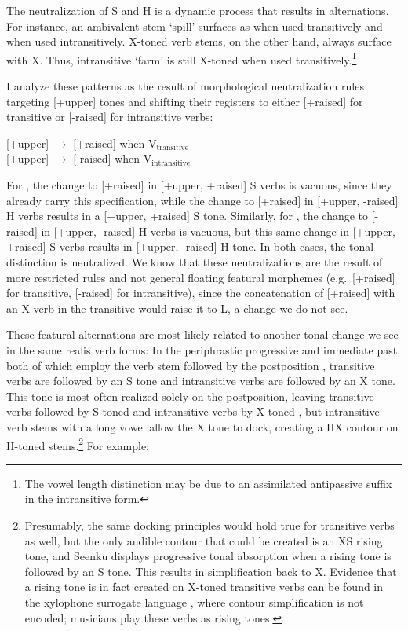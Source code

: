 \documentclass[output=paper]{langsci/langscibook}
\begin{document}
The neutralization of S and H is a dynamic process that results in alternations. For instance, an ambivalent stem {\it {}} `spill' surfaces as {\it {}} when used transitively and {\it {}} when used intransitively. X-toned verb stems, on the other hand, always surface with X. Thus, intransitive {\it {}} `farm' is still X-toned {\it {}} when used transitively.\footnote{The vowel length distinction may be due to an assimilated antipassive suffix in the intransitive form.}

I analyze these patterns as the result of morphological neutralization rules targeting [+upper] tones and shifting their registers to either [+raised] for transitive or [-raised] for intransitive verbs:

\ea\label{ex:mcpherson:13} 
\ea\label{ex:mcpherson:13a} {[}+upper] $\rightarrow$ [+raised] when V$_{\text{transitive}}$ \\
\ex\label{ex:mcpherson:13b} {[}+upper] $\rightarrow$ [-raised] when V$_{\text{intransitive}}$ \\ 
\z
\z

For , the change to [+raised] in [+upper, +raised] S verbs is vacuous, since they already carry this specification, while the change to [+raised] in [+upper, -raised] H verbs results in a [+upper, +raised] S tone. Similarly, for , the change to [-raised] in [+upper, -raised] H verbs is vacuous, but this same change in [+upper, +raised] S verbs results in [+upper, -raised] H tone. In both cases, the tonal distinction is neutralized. We know that these neutralizations are the result of more restricted rules and not general floating featural morphemes (e.g.\ [+raised] for transitive, [-raised] for intransitive), since the concatenation of [+raised] with an X verb in the transitive would raise it to L, a change we do not see.

These featural alternations are most likely related to another tonal change we see in the same realis verb forms: In the periphrastic progressive and immediate past, both of which employ the verb stem followed by the postposition {\it {}}, transitive verbs are followed by an S tone and intransitive verbs are followed by an X tone. This tone is most often realized solely on the postposition, leaving transitive verbs followed by S-toned {\it {}} and intransitive verbs by X-toned {\it {}}, but intransitive verb stems with a long vowel allow the X tone to dock, creating a HX contour on H-toned stems.\footnote{Presumably, the same docking principles would hold true for transitive verbs as well, but the only audible contour that could be created is an XS rising tone, and Seenku displays progressive tonal absorption \citep{HymanSchuh74} when a rising tone is followed by an S tone. This results in simplification back to X. Evidence that a rising tone is in fact created on X-toned transitive verbs can be found in the xylophone surrogate language \citep{McPherson16}, where contour simplification is not encoded; musicians play these verbs as rising tones.} For example:
\end{document}
